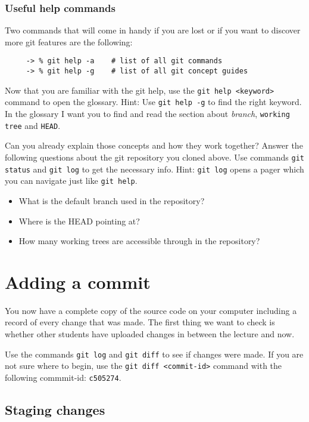 \documentclass[12pt]{article}
\begin{document}
\subsubsection{Useful help commands}
Two commands that will come in handy if you are lost
or if you want to discover more git features are the following:

    \begin{verbatim}
     -> % git help -a    # list of all git commands
     -> % git help -g    # list of all git concept guides
    \end{verbatim}

Now that you are familiar with the git help,
use the \texttt{git help <keyword>} command to open the glossary.
Hint: Use \texttt{git help -g} to find the right keyword.
In the glossary I want you to find and read the section
about \textit{branch}, \texttt{working tree} and \texttt{HEAD}. 

Can you already explain those concepts and how they work together?
Answer the following questions about the git repository you cloned above.
Use commands \texttt{git status} and \texttt{git log} to get the necessary info.
Hint: \texttt{git log} opens a pager which you can navigate just like \texttt{git help}.
\begin{itemize}
    \item What is the default branch used in the repository?
    \item Where is the HEAD pointing at?
    \item How many working trees are accessible through in the repository?
\end{itemize}




\section{Adding a commit}

You now have a complete copy of the source code on your computer
including a record of every change that was made.
The first thing we want to check is whether other students
have uploaded changes in between the lecture and now.

Use the commands \texttt{git log} and \texttt{git diff} to see if changes were made.
If you are not sure where to begin,
use the \texttt{git diff <commit-id>}
command with the following commmit-id: \texttt{c505274}.


\subsection{Staging changes}
\end{document}
